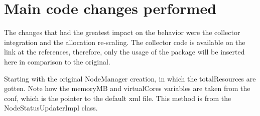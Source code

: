 \chapter{Main code changes performed}
\label{chap:codechanges}

The changes that had the greatest impact on the behavior were the collector integration and the allocation re-scaling. The collector code is available on the link at the references, therefore, only the usage of the package will be inserted here in comparison to the original.

\lstset{language=Java,
             basicstyle=\footnotesize,
             numbers=left,
             extendedchars=\true
             showspaces = false,
             numberstyle=\footnotesize,
             frame=shadowbox,
             breaklines = true}

Starting with the original NodeManager creation, in which the totalResources are gotten. Note how the memoryMB and virtualCores variables are taken from the conf, which is the pointer to the default xml file. This method is from the NodeStatusUpdaterImpl class.

